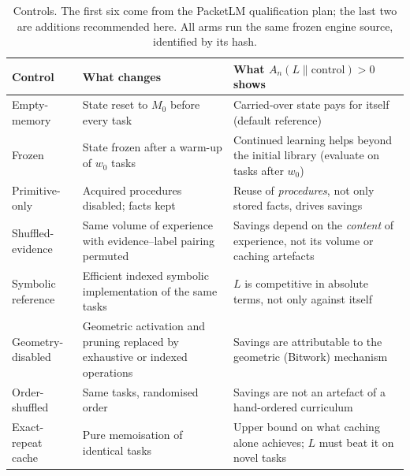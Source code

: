 \documentclass[11pt]{article}
\theoremstyle{remark}
\begin{document}
\begin{table}[ht]
\centering\small
\begin{tabularx}{\linewidth}{>{\raggedright\arraybackslash}p{2.6cm}>{\raggedright\arraybackslash}X>{\raggedright\arraybackslash}X}
\toprule
Control & What changes & What $A_n(L\|\text{control})>0$ shows\\
\midrule
Empty-memory & State reset to $M_0$ before every task & Carried-over state pays for itself (default reference)\\
Frozen & State frozen after a warm-up of $w_0$ tasks & Continued learning helps beyond the initial library (evaluate on tasks after $w_0$)\\
Primitive-only & Acquired procedures disabled; facts kept & Reuse of \emph{procedures}, not only stored facts, drives savings\\
Shuffled-evidence & Same volume of experience with evidence--label pairing permuted & Savings depend on the \emph{content} of experience, not its volume or caching artefacts\\
Symbolic reference & Efficient indexed symbolic implementation of the same tasks & $L$ is competitive in absolute terms, not only against itself\\
Geometry-disabled & Geometric activation and pruning replaced by exhaustive or indexed operations & Savings are attributable to the geometric (Bitwork) mechanism\\
Order-shuffled & Same tasks, randomised order & Savings are not an artefact of a hand-ordered curriculum\\
Exact-repeat cache & Pure memoisation of identical tasks & Upper bound on what caching alone achieves; $L$ must beat it on novel tasks\\
\bottomrule
\end{tabularx}
\caption{Controls. The first six come from the PacketLM qualification plan; the last two are additions recommended here. All arms run the same frozen engine source, identified by its hash.}
\label{tab:controls}
\end{table}
\end{document}
